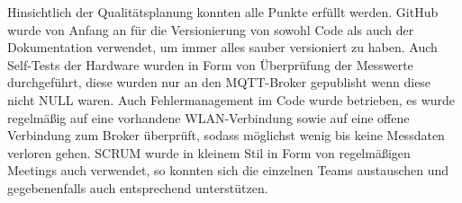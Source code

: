Hinsichtlich der Qualitätsplanung konnten alle Punkte erfüllt werden.
GitHub wurde von Anfang an für die Versionierung von sowohl Code als auch der Dokumentation verwendet, um immer alles sauber versioniert zu haben. \newline
Auch Self-Tests der Hardware wurden in Form von Überprüfung der Messwerte durchgeführt, diese wurden nur an den MQTT-Broker gepublisht wenn diese nicht NULL waren.\newline
Auch Fehlermanagement im Code wurde betrieben, es wurde regelmäßig auf eine vorhandene WLAN-Verbindung sowie auf eine offene Verbindung zum Broker überprüft, sodass möglichst wenig bis keine Messdaten verloren gehen. \newline
SCRUM wurde in kleinem Stil in Form von regelmäßigen Meetings auch verwendet, so konnten sich die einzelnen Teams austauschen und gegebenenfalls auch entsprechend unterstützen.